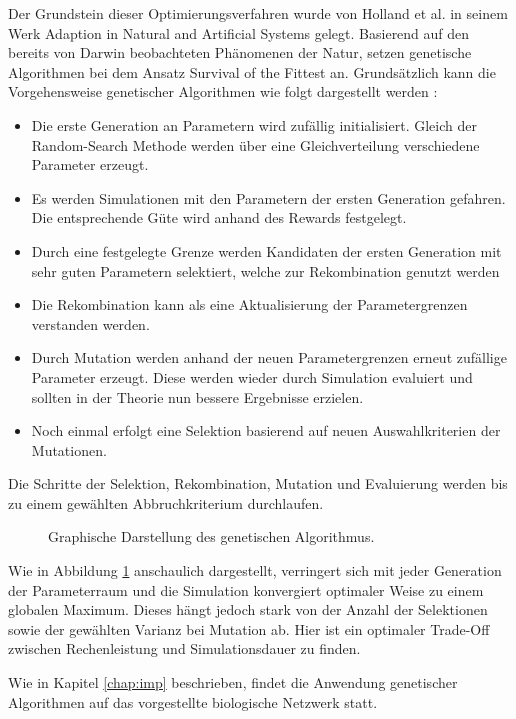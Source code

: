 		Der Grundstein dieser Optimierungsverfahren wurde von Holland et al. in seinem Werk \glqq Adaption in Natural and Artificial Systems\grqq{} \cite{Holland1992} gelegt. Basierend auf den bereits von Darwin \cite{Darwin1859} beobachteten Phänomenen der Natur, setzen genetische Algorithmen bei dem Ansatz \glqq Survival of the Fittest\grqq{} an. Grundsätzlich kann die Vorgehensweise genetischer Algorithmen wie folgt dargestellt werden \cite{Goldberg1989}:
		\begin{itemize}
			\item Die erste Generation an Parametern wird zufällig initialisiert. Gleich der Random-Search Methode werden über eine Gleichverteilung verschiedene Parameter erzeugt.
			\item Es werden Simulationen mit den Parametern der ersten Generation gefahren. Die entsprechende Güte wird anhand des Rewards festgelegt.
			\item Durch eine festgelegte Grenze werden Kandidaten der ersten Generation mit sehr guten Parametern selektiert, welche zur Rekombination genutzt werden
			\item Die Rekombination kann als eine Aktualisierung der Parametergrenzen verstanden werden.
			\item Durch Mutation werden anhand der neuen Parametergrenzen erneut zufällige Parameter erzeugt. Diese werden wieder durch Simulation evaluiert und sollten in der Theorie nun bessere Ergebnisse erzielen.
			\item Noch einmal erfolgt eine Selektion basierend auf neuen Auswahlkriterien der Mutationen.
		\end{itemize}
		Die Schritte der Selektion, Rekombination, Mutation und Evaluierung werden bis zu einem gewählten Abbruchkriterium durchlaufen.
		\begin{figure}[H] %
			\centering
			\def\svgwidth{12cm}
			
			\caption{Graphische Darstellung des genetischen Algorithmus.}
			\label{fig:gen_chart}
		\end{figure}
		Wie in Abbildung \ref{fig:gen_chart} anschaulich dargestellt, verringert sich mit jeder Generation der Parameterraum und die Simulation konvergiert optimaler Weise zu einem globalen Maximum. Dieses hängt jedoch stark von der Anzahl der Selektionen sowie der gewählten Varianz bei Mutation ab. Hier ist ein optimaler Trade-Off zwischen Rechenleistung und Simulationsdauer zu finden.
		
		Wie in Kapitel \ref{chap:imp} beschrieben, findet die Anwendung genetischer Algorithmen auf das vorgestellte biologische Netzwerk statt.
	
